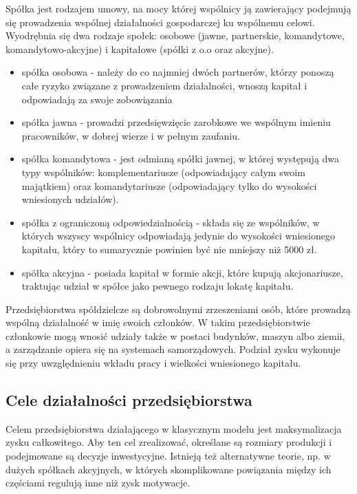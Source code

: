 \documentclass[12pt]{extarticle}
\begin{document}
Spółka jest rodzajem umowy, na mocy której wspólnicy ją zawierający podejmują się prowadzenia wspólnej działalności gospodarczej ku wspólnemu celowi. Wyodrębnia się dwa rodzaje społek: osobowe (jawne, partnerskie, komandytowe, komandytowo-akcyjne) i kapitałowe (spółki z o.o oraz akcyjne).

\begin{itemize}
	\item spółka osobowa - należy do co najmniej dwóch partnerów, którzy ponoszą całe ryzyko związane z prowadzeniem działalności, wnoszą kapitał i odpowiadają za swoje zobowiązania
    \item spółka jawna - prowadzi przedsięwzięcie zarobkowe we wspólnym imieniu pracowników, w dobrej wierze i w pełnym zaufaniu.
    \item spółka komandytowa - jest odmianą spółki jawnej, w której występują dwa typy wspólników: komplementariusze (odpowiadający całym swoim majątkiem) oraz komandytariusze (odpowiadający tylko do wysokości wniesionych udziałów).
    \item spółka z ograniczoną odpowiedzialnością - składa się ze wspólników, w których wszyscy wspólnicy odpowiadają jedynie do wysokości wniesionego kapitału, który to sumarycznie powinien być nie mniejszy niż 5000 zł.
    \item spółka akcyjna - posiada kapitał w formie akcji, które kupują akcjonariusze, traktując udział w spółce jako pewnego rodzaju lokatę kapitału.
\end{itemize}


Przedsiębiorstwa spółdzielcze są dobrowolnymi zrzeszeniami osób, które prowadzą wspólną działalność w imię swoich członków. W takim przedsiębiorstwie członkowie mogą wnosić udziały także w postaci budynków, maszyn albo ziemii, a zarządzanie opiera się na systemach samorządowych. Podział zysku wykonuje się przy uwzględnieniu wkładu pracy i wielkości wniesionego kapitału.

\subsection{Cele działalności przedsiębiorstwa}

Celem przedsiębiorstwa działającego w klasycznym modelu jest maksymalizacja zysku całkowitego. Aby ten cel zrealizować, określane są rozmiary produkcji i podejmowane są decyzje inwestycyjne. Istnieją też alternatywne teorie, np. w dużych spółkach akcyjnych, w których skomplikowane powiązania między ich częściami regulują inne niż zysk motywacje. 
\end{document}
